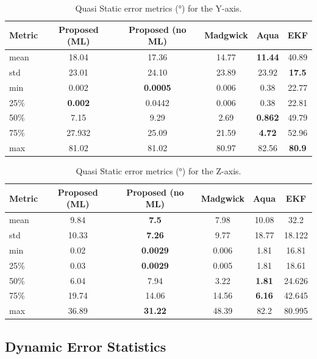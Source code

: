 \documentclass{iutbscthesis}
\begin{document}
\begin{table}[H]
\centering
\scriptsize
\caption{Quasi Static error metrics (°) for the Y-axis.}
\label{tab:quasi_y}
\begin{tabular}{lccccc}
\toprule
Metric & Proposed (ML) & Proposed (no ML) & Madgwick & Aqua & EKF \\
\midrule
mean & 18.04 & 17.36 & 14.77 & \textbf{11.44} & 40.89 \\
std & 23.01 & 24.10 & 23.89 & 23.92 & \textbf{17.5} \\
min & 0.002 & \textbf{0.0005} & 0.006 & 0.38 & 22.77 \\
25\% & \textbf{0.002} & 0.0442 & 0.006 & 0.38 & 22.81 \\
50\% & 7.15 & 9.29 & 2.69 & \textbf{0.862} & 49.79 \\
75\% & 27.932& 25.09 & 21.59 & \textbf{4.72} & 52.96 \\
max & 81.02 & 81.02 & 80.97 & 82.56 & \textbf{80.9} \\
\bottomrule
\end{tabular}
\end{table}

\begin{table}[H]
\centering
\scriptsize
\caption{Quasi Static error metrics (°) for the Z-axis.}
\label{tab:quasi_z}
\begin{tabular}{lccccc}
\toprule
Metric & Proposed (ML) & Proposed (no ML) & Madgwick & Aqua & EKF \\
\midrule
mean & 9.84 & \textbf{7.5} & 7.98 & 10.08 & 32.2 \\
std & 10.33 & \textbf{7.26} & 9.77 & 18.77 & 18.122 \\
min & 0.02 & \textbf{0.0029} & 0.006 & 1.81 & 16.81 \\
25\% & 0.03 & \textbf{0.0029} & 0.005 & 1.81 & 18.61 \\
50\% & 6.04 & 7.94 & 3.22 & \textbf{1.81} & 24.626 \\
75\% & 19.74 & 14.06 & 14.56 & \textbf{6.16} & 42.645 \\
max & 36.89 & \textbf{31.22} & 48.39 & 82.2 & 80.995 \\
\bottomrule
\end{tabular}
\end{table}

\subsection{Dynamic Error Statistics}
\end{document}

